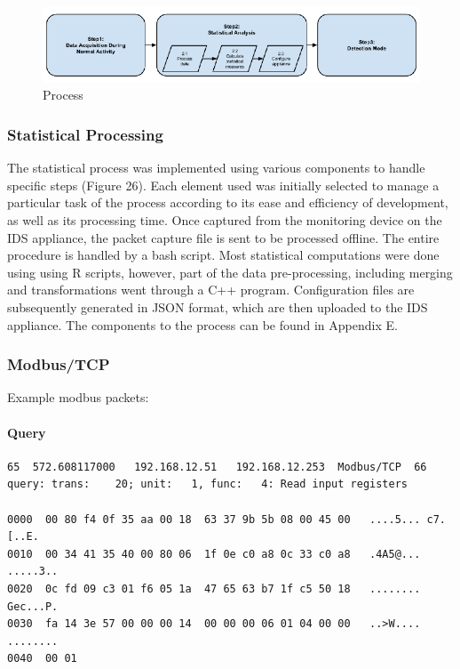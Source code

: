\documentclass[12pt,]{article}
\begin{document}
\begin{figure}

{\centering \includegraphics{thesis_files/figure-latex/unnamed-chunk-39-1} 

}

\caption{Process}\label{fig:unnamed-chunk-39}
\end{figure}

\subsubsection{Statistical Processing}\label{statistical-processing}

The statistical process was implemented using various components to
handle specific steps (Figure 26). Each element used was initially
selected to manage a particular task of the process according to its
ease and efficiency of development, as well as its processing time. Once
captured from the monitoring device on the IDS appliance, the packet
capture file is sent to be processed offline. The entire procedure is
handled by a bash script. Most statistical computations were done using
using R scripts, however, part of the data pre-processing, including
merging and transformations went through a C++ program. Configuration
files are subsequently generated in JSON format, which are then uploaded
to the IDS appliance. The components to the process can be found in
Appendix E.

\subsubsection{Modbus/TCP}\label{modbustcp-1}

Example modbus packets:

\paragraph{Query}\label{query}

\begin{verbatim}
65  572.608117000   192.168.12.51   192.168.12.253  Modbus/TCP  66
query: trans:    20; unit:   1, func:   4: Read input registers

0000  00 80 f4 0f 35 aa 00 18  63 37 9b 5b 08 00 45 00   ....5... c7.[..E.
0010  00 34 41 35 40 00 80 06  1f 0e c0 a8 0c 33 c0 a8   .4A5@... .....3..
0020  0c fd 09 c3 01 f6 05 1a  47 65 63 b7 1f c5 50 18   ........ Gec...P.
0030  fa 14 3e 57 00 00 00 14  00 00 00 06 01 04 00 00   ..>W.... ........
0040  00 01    
\end{verbatim}
\end{document}
